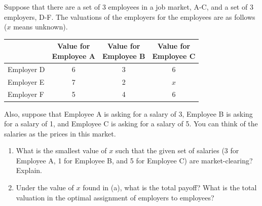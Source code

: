 \documentclass[newpages, arabicsubsec]{assignment}
\begin{document}
\begin{problem}
Suppose that there are a set of 3 employees in a job market, A-C, and a set of 3 employers, D-F. The valuations of the employers for the employees are as follows (\(x\) means unknown).

\begin{table}[h!]
    \centering
    \begin{tabular}{lccc}
        \toprule
                   & \shortstack{Value for             \\Employee A} & \shortstack{Value for\\Employee B} & \shortstack{Value for\\Employee C} \\
        \midrule
        Employer D & 6                     & 3 & 6     \\
        Employer E & 7                     & 2 & \(x\) \\
        Employer F & 5                     & 4 & 6     \\
        \bottomrule
    \end{tabular}
\end{table}

Also, suppose that Employee A is asking for a salary of 3, Employee B is asking for a salary of 1, and Employee C is asking for a salary of 5. You can think of the salaries as the prices in this market.

\begin{enumerate}[label=\alph*.]
    \item What is the smallest value of \(x\) such that the given set of salaries (3 for Employee A, 1 for Employee B, and 5 for Employee C) are market-clearing? Explain.
    \item Under the value of \(x\) found in (a), what is the total payoff? What is the total valuation in the optimal assignment of employers to employees?
\end{enumerate}
\end{problem}
\end{document}
